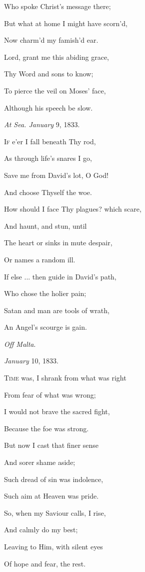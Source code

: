 Who spoke Christ's message there;

But what at home I might have scorn'd,

Now charm'd my famish'd ear.

Lord, grant me this abiding grace,

Thy Word and sons to know;

To pierce the veil on Moses' face,

Although his speech be slow.

\emph{At Sea. January} 9, 1833.


I\textsc{f} e'er I fall beneath Thy rod,

As through life's snares I go,

Save me from David's lot, O God!

And choose Thyself the woe.

How should I face Thy plagues? which scare,

And haunt, and stun, until

The heart or sinks in mute despair,

Or names a random ill.

If else ... then guide in David's path,

Who chose the holier pain;

Satan and man are tools of wrath,

An Angel's scourge is gain.

\emph{Off Malta}.

\emph{January} 10, 1833.


T\textsc{ime} was, I shrank from what was right

From fear of what was wrong;

I would not brave the sacred fight,

Because the foe was strong.

But now I cast that finer sense

And sorer shame aside;

Such dread of sin was indolence,

Such aim at Heaven was pride.

So, when my Saviour calls, I rise,

And calmly do my best;

Leaving to Him, with silent eyes

Of hope and fear, the rest. 

